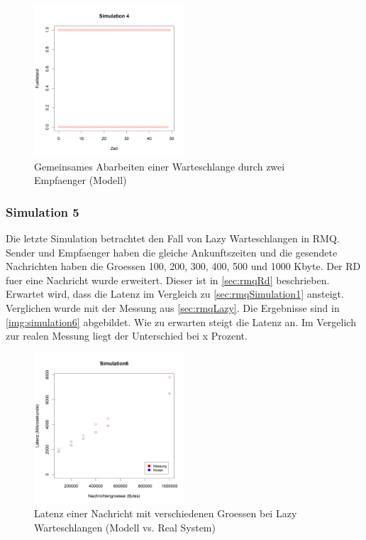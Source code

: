 \begin{figure}
\center
  \includegraphics[width=0.5\textwidth]{images/modelSimulationResults/simulation4.png}
  \caption{Gemeinsames Abarbeiten einer Warteschlange durch zwei Empfaenger (Modell)}
  \label{img:simulation4}
\end{figure}



\subsubsection{Simulation 5}
Die letzte Simulation betrachtet den Fall von Lazy Warteschlangen in RMQ. Sender und Empfaenger haben die gleiche Ankunftszeiten und die gesendete Nachrichten haben die Groessen 100, 200, 300, 400, 500 und 1000 Kbyte. Der RD fuer eine Nachricht wurde erweitert. Dieser ist in \autoref{sec:rmqRd} beschrieben. Erwartet wird, dass die Latenz im Vergleich zu \autoref{sec:rmqSimulation1} ansteigt. Verglichen wurde mit der Messung aus \autoref{sec:rmqLazy}.
Die Ergebnisse sind in \autoref{img:simulation6} abgebildet. Wie zu erwarten steigt die Latenz an. Im Vergelich zur realen Messung liegt der Unterschied bei x Prozent.
\begin{figure}
\center
  \includegraphics[width=0.5\textwidth]{images/modelSimulationResults/simulation6.png}
  \caption{Latenz einer Nachricht mit verschiedenen Groessen bei Lazy Warteschlangen (Modell vs. Real System)}
  \label{img:simulation6}
\end{figure}



